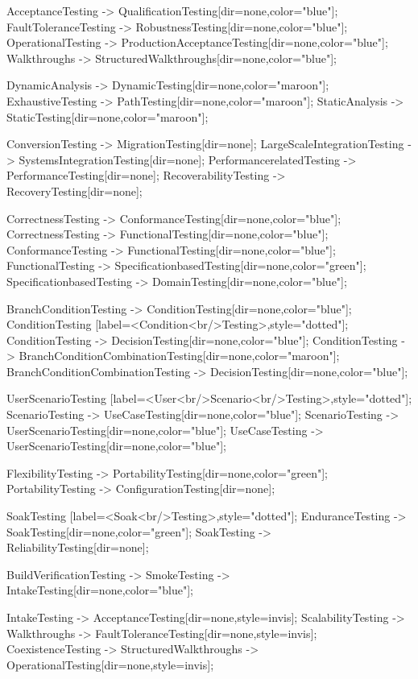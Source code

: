 \documentclass{article}
\begin{document}
{AcceptanceTesting -> QualificationTesting[dir=none,color="blue"];
FaultToleranceTesting -> RobustnessTesting[dir=none,color="blue"];
OperationalTesting -> ProductionAcceptanceTesting[dir=none,color="blue"];
Walkthroughs -> StructuredWalkthroughs[dir=none,color="blue"];

DynamicAnalysis -> DynamicTesting[dir=none,color="maroon"];
ExhaustiveTesting -> PathTesting[dir=none,color="maroon"];
StaticAnalysis -> StaticTesting[dir=none,color="maroon"];

ConversionTesting -> MigrationTesting[dir=none];
LargeScaleIntegrationTesting -> SystemsIntegrationTesting[dir=none];
PerformancerelatedTesting -> PerformanceTesting[dir=none];
RecoverabilityTesting -> RecoveryTesting[dir=none];

CorrectnessTesting -> ConformanceTesting[dir=none,color="blue"];
CorrectnessTesting -> FunctionalTesting[dir=none,color="blue"];
ConformanceTesting -> FunctionalTesting[dir=none,color="blue"];
FunctionalTesting -> SpecificationbasedTesting[dir=none,color="green"];
SpecificationbasedTesting -> DomainTesting[dir=none,color="blue"];

BranchConditionTesting -> ConditionTesting[dir=none,color="blue"];
ConditionTesting [label=<Condition<br/>Testing>,style="dotted"];
ConditionTesting -> DecisionTesting[dir=none,color="blue"];
ConditionTesting -> BranchConditionCombinationTesting[dir=none,color="maroon"];
BranchConditionCombinationTesting -> DecisionTesting[dir=none,color="blue"];

UserScenarioTesting [label=<User<br/>Scenario<br/>Testing>,style="dotted"];
ScenarioTesting -> UseCaseTesting[dir=none,color="blue"];
ScenarioTesting -> UserScenarioTesting[dir=none,color="blue"];
UseCaseTesting -> UserScenarioTesting[dir=none,color="blue"];

FlexibilityTesting -> PortabilityTesting[dir=none,color="green"];
PortabilityTesting -> ConfigurationTesting[dir=none];

SoakTesting [label=<Soak<br/>Testing>,style="dotted"];
EnduranceTesting -> SoakTesting[dir=none,color="green"];
SoakTesting -> ReliabilityTesting[dir=none];

BuildVerificationTesting -> SmokeTesting -> IntakeTesting[dir=none,color="blue"];

IntakeTesting -> AcceptanceTesting[dir=none,style=invis];
ScalabilityTesting -> Walkthroughs -> FaultToleranceTesting[dir=none,style=invis];
CoexistenceTesting -> StructuredWalkthroughs -> OperationalTesting[dir=none,style=invis];

}
\end{document}
